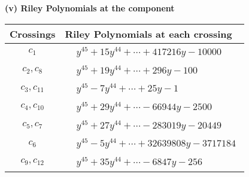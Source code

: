 \documentclass[1p]{elsarticle_modified}
\theoremstyle{definition}
\begin{document}
\flushleft \textbf{(v) Riley Polynomials at the component}\newline \\
\begin{tabular}{m{50pt}|m{274pt}}
Crossings & \hspace{64pt}Riley Polynomials at each crossing \\
\hline $$\begin{aligned}c_{1}\end{aligned}$$&$\begin{aligned}
&y^{45}+15 y^{44}+\cdots+417216 y-10000
\end{aligned}$\\
\hline $$\begin{aligned}c_{2},c_{8}\end{aligned}$$&$\begin{aligned}
&y^{45}+19 y^{44}+\cdots+296 y-100
\end{aligned}$\\
\hline $$\begin{aligned}c_{3},c_{11}\end{aligned}$$&$\begin{aligned}
&y^{45}-7 y^{44}+\cdots+25 y-1
\end{aligned}$\\
\hline $$\begin{aligned}c_{4},c_{10}\end{aligned}$$&$\begin{aligned}
&y^{45}+29 y^{44}+\cdots-66944 y-2500
\end{aligned}$\\
\hline $$\begin{aligned}c_{5},c_{7}\end{aligned}$$&$\begin{aligned}
&y^{45}+27 y^{44}+\cdots-283019 y-20449
\end{aligned}$\\
\hline $$\begin{aligned}c_{6}\end{aligned}$$&$\begin{aligned}
&y^{45}-5 y^{44}+\cdots+32639808 y-3717184
\end{aligned}$\\
\hline $$\begin{aligned}c_{9},c_{12}\end{aligned}$$&$\begin{aligned}
&y^{45}+35 y^{44}+\cdots-6847 y-256
\end{aligned}$\\
\hline
\end{tabular}\\~\\
\end{document}
